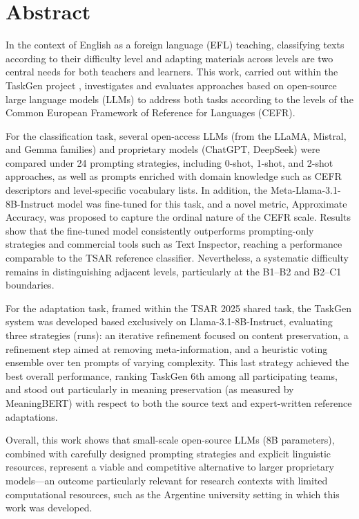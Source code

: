 \section*{Abstract}

In the context of English as a foreign language (EFL) teaching, classifying texts according to their difficulty level and adapting materials across levels are two central needs for both teachers and learners. This work, carried out within the TaskGen project \parencite{Vives2024}, investigates and evaluates approaches based on open-source large language models (LLMs) to address both tasks according to the levels of the Common European Framework of Reference for Languages (CEFR).

For the classification task, several open-access LLMs (from the LLaMA, Mistral, and Gemma families) and proprietary models (ChatGPT, DeepSeek) were compared under 24 prompting strategies, including 0-shot, 1-shot, and 2-shot approaches, as well as prompts enriched with domain knowledge such as CEFR descriptors and level-specific vocabulary lists. In addition, the Meta-Llama-3.1-8B-Instruct model was fine-tuned for this task, and a novel metric, Approximate Accuracy, was proposed to capture the ordinal nature of the CEFR scale. Results show that the fine-tuned model consistently outperforms prompting-only strategies and commercial tools such as Text Inspector, reaching a performance comparable to the TSAR reference classifier. Nevertheless, a systematic difficulty remains in distinguishing adjacent levels, particularly at the B1--B2 and B2--C1 boundaries.

For the adaptation task, framed within the TSAR 2025 shared task, the TaskGen system was developed based exclusively on Llama-3.1-8B-Instruct, evaluating three strategies (runs): an iterative refinement focused on content preservation, a refinement step aimed at removing meta-information, and a heuristic voting ensemble over ten prompts of varying complexity. This last strategy achieved the best overall performance, ranking TaskGen 6th among all participating teams, and stood out particularly in meaning preservation (as measured by MeaningBERT) with respect to both the source text and expert-written reference adaptations.

Overall, this work shows that small-scale open-source LLMs (8B parameters), combined with carefully designed prompting strategies and explicit linguistic resources, represent a viable and competitive alternative to larger proprietary models---an outcome particularly relevant for research contexts with limited computational resources, such as the Argentine university setting in which this work was developed.